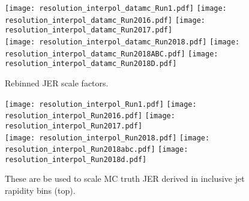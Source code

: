\documentclass[landscape,10pt]{beamer} %
\begin{document}
\newpage
\begin{figure}[p]
\centering
\texttt{[image: resolution\_interpol\_datamc\_Run1.pdf]}
\texttt{[image: resolution\_interpol\_datamc\_Run2016.pdf]}
\texttt{[image: resolution\_interpol\_datamc\_Run2017.pdf]}
\\
\texttt{[image: resolution\_interpol\_datamc\_Run2018.pdf]}
\texttt{[image: resolution\_interpol\_datamc\_Run2018ABC.pdf]}
\texttt{[image: resolution\_interpol\_datamc\_Run2018D.pdf]}
\caption{Rebinned JER scale factors.}
\end{figure}

\begin{figure}[p]
\centering
  \texttt{[image: resolution\_interpol\_Run1.pdf]}
  \texttt{[image: resolution\_interpol\_Run2016.pdf]}
  \texttt{[image: resolution\_interpol\_Run2017.pdf]}
\\
  \texttt{[image: resolution\_interpol\_Run2018.pdf]}
  \texttt{[image: resolution\_interpol\_Run2018abc.pdf]}
  \texttt{[image: resolution\_interpol\_Run2018d.pdf]}
\caption{These are be used to scale MC truth JER derived in inclusive jet rapidity bins (top).}
\end{figure}

\newpage
\end{document}
